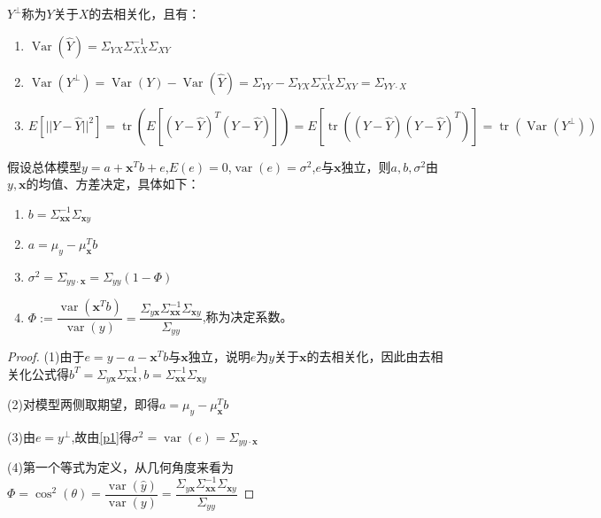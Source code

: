 \documentclass[cn,hazy,green,12pt,normal]{elegantnote}
\DeclareMathOperator{\Var}{Var}
\DeclareMathOperator{\var}{var}
\DeclareMathOperator{\tr}{tr}
\numberwithin{equation}{section}
\numberwithin{subsection}{section}
\begin{document}
$Y^{\perp}$称为$Y$关于$X$的去相关化，且有：
\begin{proposition}\label{p1}
    \begin{enumerate}
        \item $\Var(\hat{Y})=\Sigma_{YX}\Sigma_{XX}^{-1}\Sigma_{XY}$
        \item  $\Var(Y^{\perp})=\Var(Y)-\Var(\hat{Y})=\Sigma_{YY}-\Sigma_{YX}\Sigma_{XX}^{-1}\Sigma_{XY}=\Sigma_{YY\cdot X}$
        \item $E[||Y-\hat{Y}||^2]=\tr(E[(Y-\hat{Y})^T(Y-\hat{Y})])=E[\tr((Y-\hat{Y})(Y-\hat{Y})^T)]=\tr(\Var(Y^{\perp}))$
    \end{enumerate}
\end{proposition}

\begin{proposition}
    假设总体模型$y = a+\bm x^T b+e$,$E(e)=0$,$\var(e)=\sigma^2$,$e\text{与}\bm x$独立，则$a,b,\sigma^2$由$y,\bm x$的均值、方差决定，具体如下：
    \begin{enumerate}
        \item $b=\Sigma_{\bm x \bm x}^{-1}\Sigma_{\bm x y}$
        \item $a=\mu_{y}-\mu_{\bm x}^T b$
        \item $\sigma^2=\Sigma_{yy\cdot \bm x}=\Sigma_{yy}(1-\Phi)$
        \item $\Phi:=\dfrac{\var(\bm x^T b)}{\var (y)}=\dfrac{\Sigma_{y\bm x}\Sigma_{\bm x\bm x}^{-1}\Sigma_{\bm x y}}{\Sigma_{yy}}$,称为决定系数。
    \end{enumerate}
\end{proposition}
\begin{proof}
    (1)由于$e=y-a-\bm x^Tb$与$\bm x$独立，说明$e$为$y$关于$\bm x$的去相关化，因此由去相关化公式得$b^T=\Sigma_{y\bm x}\Sigma_{\bm x\bm x}^{-1},b=\Sigma_{\bm x \bm x}^{-1}\Sigma_{\bm x y}$

    \noindent (2)对模型两侧取期望，即得$a=\mu_{y}-\mu_{\bm x}^T b$
    
    \noindent (3)由$e=y^{\perp}$,故由\ref{p1}得$\sigma^2=\var(e)=\Sigma_{yy\cdot \bm x}$

    \noindent (4)第一个等式为定义，从几何角度来看为$\Phi=\cos^2(\theta)=\dfrac{\var(\hat{y})}{\var(y)}=\dfrac{\Sigma_{y\bm x}\Sigma_{\bm x\bm x}^{-1}\Sigma_{\bm x y}}{\Sigma_{yy}}$
\end{proof}
\end{document}
